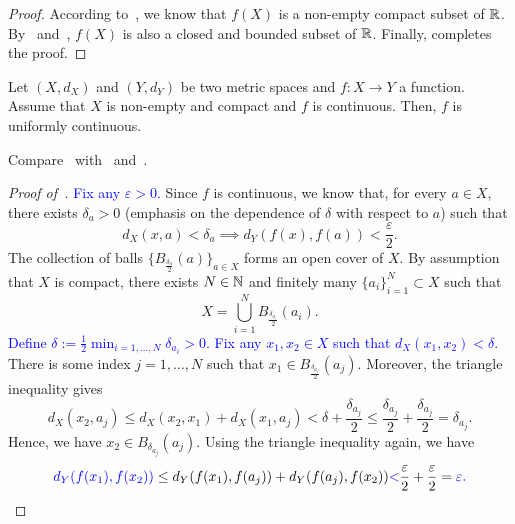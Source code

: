 \begin{proof}
	According to~, we know that $f(X)$ is a non-empty compact subset of $\mathbb{R}$. By~ and~, $f(X)$ is also a closed and bounded subset of $\mathbb{R}$. Finally,  completes the proof.
\end{proof}
\begin{prop}
	\label{prop:cpct+cts_imp_unif}
	Let $(X,d_X)$ and $(Y,d_Y)$ be two metric spaces and $f:X\to Y$ a function. Assume that $X$ is non-empty and compact and $f$ is continuous. Then, $f$ is uniformly continuous.
\end{prop}
\begin{rem}
	Compare~ with~ and~.
\end{rem}
\begin{proof}[Proof of~]
	\textcolor{blue}{Fix any $\varepsilon>0$.} Since $f$ is continuous, we know that, for every $a\in X$, there exists $\delta_a>0$ (emphasis on the dependence of $\delta$ with respect to $a$) such that 
	\[
	d_X(x,a) < \delta_a \implies d_Y(f(x),f(a))<\frac{\varepsilon}{2}.
	\]
	The collection of balls $\{B_{\frac{\delta_a}{2}}(a)\}_{a\in X}$ forms an open cover of $X$. By assumption that $X$ is compact, there exists $N\in\mathbb{N}$ and finitely many $\{a_i\}_{i=1}^N \subset X$ such that
	\[
	X = \bigcup_{i=1}^N B_{\frac{\delta_{a_i}}{2}}(a_i).
	\]
	\textcolor{blue}{Define $\delta := \frac{1}{2}\min_{i=1,\dots, N}\delta_{a_i}>0$. Fix any $x_1,x_2\in X$ such that $d_X(x_1,x_2)<\delta$.} There is some index $j=1,\dots, N$ such that $x_1 \in B_{\frac{\delta_{a_j}}{2}}(a_j)$. Moreover, the triangle inequality gives
	\[
	d_X(x_2,a_j)\le d_X(x_2,x_1) + d_X(x_1,a_j) < \delta + \frac{\delta_{a_j}}{2} \le \frac{\delta_{a_j}}{2} + \frac{\delta_{a_j}}{2} = \delta_{a_j}.
	\]
	Hence, we have $x_2 \in B_{\delta_{a_j}}(a_j)$. Using the triangle inequality again, we have
	\[
	\textcolor{blue}{d_Y(f(x_1),f(x_2))}\le d_Y(f(x_1),f(a_j)) + d_Y(f(a_j),f(x_2)) \textcolor{blue}{<}\frac{\varepsilon}{2} + \frac{\varepsilon}{2} = \textcolor{blue}{\varepsilon.}
	\]
\end{proof}